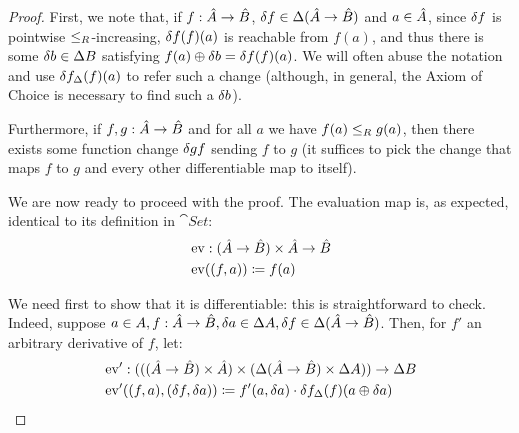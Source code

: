\begin{proof}
  First, we note that, if $f : \hat{A} \rightarrow \hat{B}$, $\delta f \in \Delta (\hat{A} \rightarrow \hat{B})$
  and $a \in \hat{A}$, since $\delta f$ is pointwise $\leq_R$-increasing, $\delta f(f)(a)$ is reachable
  from $f(a)$, and thus there is some $\delta b \in \Delta B$ satisfying $f(a) \oplus \delta b = \delta f(f)(a)$.
  We will often abuse the notation and use $\delta f_\Delta(f)(a)$ to refer such a change (although, in general, the Axiom
  of Choice is necessary to find such a $\delta b$).


  Furthermore, if $f, g : \hat{A} \rightarrow \hat{B}$ and for all $a$ we have $f(a) \leq_R g(a)$, then there exists
  some function change $\delta gf$ sending $f$ to $g$ (it suffices to pick the change that maps $f$ to $g$ and every other
  differentiable map to itself).

  We are now ready to proceed with the proof. The evaluation map is, as expected, identical to its definition in $\cat{Set}$:
  \begin{align*}
    &\operatorname{ev} : (\hat{A} \rightarrow \hat{B}) \times \hat{A} \rightarrow \hat{B}\\
    &\operatorname{ev}((f, a)) \coloneqq f(a)
  \end{align*}

  We need first to show that it is differentiable: this is straightforward to check. Indeed, suppose 
  $a \in A, f : \hat{A} \rightarrow \hat{B}, \delta a \in \Delta A, \delta f \in \Delta (\hat{A} \rightarrow \hat{B})$.
  Then, for $f'$ an arbitrary derivative of $f$, let:
  \begin{align*}
    &\operatorname{ev}' : (((\hat{A} \rightarrow \hat{B}) \times \hat{A}) \times (\Delta (\hat{A} \rightarrow \hat{B}) \times \Delta A)) \rightarrow \Delta B\\
    &\operatorname{ev}'((f, a), (\delta f, \delta a)) \coloneqq f'(a, \delta a) \cdot \delta f_\Delta(f)(a \oplus \delta a)
  \end{align*}


\end{proof}
